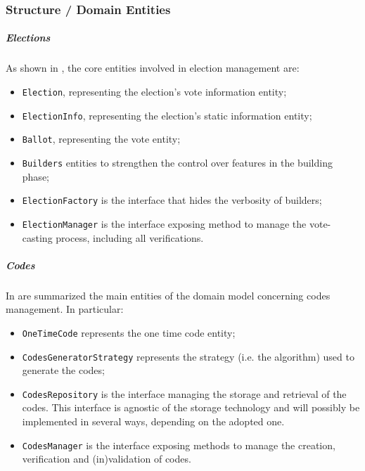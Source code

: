 \documentclass{scrartcl}
\begin{document}
\subsubsection{Structure / Domain Entities}

\subparagraph*{Elections}

As shown in , the core entities involved in election management are:
\begin{itemize}
    \item \texttt{Election}, representing the election's vote information entity;
    \item \texttt{ElectionInfo}, representing the election's static information entity;
    \item \texttt{Ballot}, representing the vote entity;
    \item \texttt{Builders} entities to strengthen the control over features in the building phase;
    \item \texttt{ElectionFactory} is the interface that hides the verbosity of builders;
    \item \texttt{ElectionManager} is the interface exposing method to manage the vote-casting process, including all verifications.
\end{itemize}

\subparagraph*{Codes}

In  are summarized the main entities of the domain model concerning codes management.
%
In particular:
%
\begin{itemize}
    \item \texttt{OneTimeCode} represents the one time code entity;
    \item \texttt{CodesGeneratorStrategy} represents the strategy (i.e. the algorithm) used to generate the codes;
    \item \texttt{CodesRepository} is the interface managing the storage and retrieval of the codes. This interface is agnostic of the storage technology and will possibly be implemented in several ways, depending on the adopted one.
    \item \texttt{CodesManager} is the interface exposing methods to manage the creation, verification and (in)validation of codes. 
\end{itemize}
\end{document}
